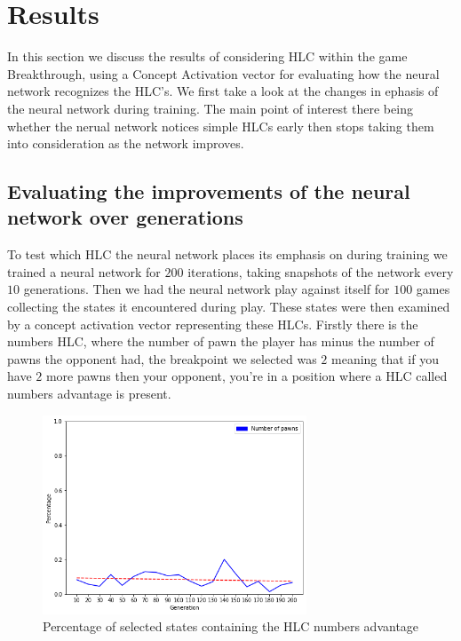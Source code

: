\chapter{Results}


In this section we discuss the results of considering HLC within the game Breakthrough, using a Concept Activation vector for evaluating how the neural network recognizes the HLC's. We first take a look at the changes in ephasis of the neural network during training. The main point of interest there being whether the nerual network notices simple HLCs early then stops taking them into consideration as the network improves.

\section{Evaluating the improvements of the neural network over generations}

To test which HLC the neural network places its emphasis on during training we trained a neural network for $200$ iterations, taking snapshots of the network every $10$ generations. Then we had the neural network play against itself for $100$ games collecting the states it encountered during play. These states were then examined by a concept activation vector representing these HLCs. Firstly there is the numbers HLC, where the number of pawn the player has minus the number of pawns the opponent had, the breakpoint we selected was $2$ meaning that if you have $2$ more pawns then your opponent, you're in a position where a HLC called numbers advantage is present.

\begin{figure}[]
    \centering
    \includegraphics[width=0.7\textwidth]{graphics/number_pawns_trend}
    \caption{Percentage of selected states containing the HLC numbers advantage}
    \label{fig:numberadvantage}
\end{figure}

